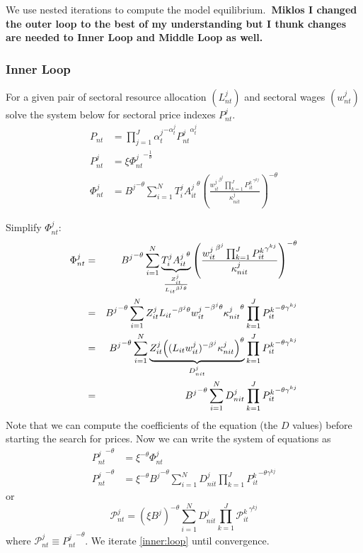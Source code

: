\documentclass[12pt]{article}
\begin{document}
We use nested iterations to compute the model equilibrium.\textbf{\ Miklos I
changed the outer loop to the best of my understanding but I thunk changes
are needed to Inner Loop and Middle Loop as well.}

\subsubsection*{Inner Loop}

For a given pair of sectoral resource allocation $(L_{nt}^{j})$ and sectoral
wages $(w_{nt}^{j})$ solve the system below for sectoral price indexes $%
P_{nt}^{j}.$%
\begin{align*}
P_{nt}& =\prod_{j=1}^{J}{\alpha _{t}^{j}}^{-\alpha _{t}^{j}}{P_{nt}^{j}}%
^{\alpha _{t}^{j}} \\
P_{nt}^{j}& =\xi {\Phi _{nt}^{j}}^{-\frac{1}{\theta }} \\
\Phi _{nt}^{j}& ={B^{j}}^{-\theta }\sum_{i=1}^{N}T_{i}^{j}{A_{it}^{j}}%
^{\theta }\left( \frac{{w_{it}^{j}}^{\beta ^{j}}\prod_{k=1}^{J}{P_{it}^{k}}%
^{\gamma ^{kj}}}{\kappa _{nit}^{j}}\right) ^{-\theta }
\end{align*}

Simplify $\Phi_{nt}^j:$ 
\begin{eqnarray*}
\Phi_{nt}^j &=& {B^j}^{-\theta} \sum_{i = 1}^N \underbrace{T_i^j {A_{it}^j}%
^{\theta}}_{\frac{Z_{it}^j}{{L_{it}}^{\beta^j\theta}}} \left(\frac{ {w_{it}^j%
}^{\beta^j} \prod_{k = 1}^{J}{P_{it}^k}^{\gamma^{kj}}}{\kappa_{nit}^j}%
\right)^{-\theta} \\
&=& {B^j}^{-\theta} \sum_{i = 1}^N Z_{it}^j {L_{it}}^{- \beta^j\theta} {%
w_{it}^j}^{-\beta^j\theta} {\kappa_{nit}^j}^{\theta} \prod_{k = 1}^{J}{%
P_{it}^k}^{-\theta\gamma^{kj}} \\
&=& {B^j}^{-\theta} \sum_{i = 1}^N \underbrace{Z_{it}^j {%
\left((L_{it}w_{it}^j)^{- \beta^j} \kappa_{nit}^j\right)}^{\theta}}%
_{D_{nit}^j} \prod_{k = 1}^{J}{P_{it}^k}^{-\theta\gamma^{kj}} \\
&=& {B^j}^{-\theta} \sum_{i = 1}^N D_{nit}^j \prod_{k = 1}^{J}{P_{it}^k}%
^{-\theta\gamma^{kj}}
\end{eqnarray*}
Note that we can compute the coefficients of the equation (the $D$ values)
before starting the search for prices. Now we can write the system of
equations as 
\begin{align*}
{P_{nt}^j}^{-\theta} &= \xi^{-\theta} {\Phi_{nt}^j} \\
{P_{nt}^j}^{-\theta} &= \xi^{-\theta} {{B^j}^{-\theta} \sum_{i = 1}^N
D_{nit}^j \prod_{k = 1}^{J}{P_{it}^k}^{-\theta\gamma^{kj}}}
\end{align*}
or 
\begin{equation}  \label{inner:loop}
\mathcal{P}_{nt}^j = \left(\xi B^j\right)^{-\theta} \sum_{i = 1}^N D_{nit}^j
\prod_{k = 1}^{J}{\mathcal{P}_{it}^k}^{\gamma^{kj}}
\end{equation}
where $\mathcal{P}_{nt}^j \equiv {P_{nt}^j}^{-\theta}$. We iterate %
\eqref{inner:loop} until convergence.
\end{document}
